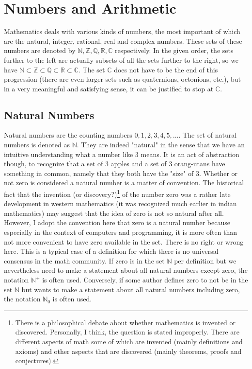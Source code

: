 \section{Numbers and Arithmetic} 

Mathematics deals with various kinds of numbers, the most important of which are the natural, integer, rational, real and complex numbers. These sets of these numbers are denoted by  $\mathbb{N,Z,Q,R,C}$ respectively. In the given order, the sets further to the left are actually subsets of all the sets further to the right, so we have $\mathbb{N \subset Z \subset Q \subset R \subset C}$. The set $\mathbb{C}$ does not have to be the end of this progression (there are even larger sets such as quaternions, octonions, etc.), but in a very meaningful and satisfying sense, it can be justified to stop at $\mathbb{C}$.

\subsection{Natural Numbers}
Natural numbers are the counting numbers $0,1,2,3,4,5,\ldots$. The set of natural numbers is denoted as $\mathbb{N}$. They are indeed "natural" in the sense that we have an intuitive understanding what a number like $3$ means. It is an act of abstraction though, to recognize that a set of 3 apples and a set of 3 orang-utans have something in common, namely that they both have the "size" of 3. Whether or not zero is considered a natural number is a matter of convention. The historical fact that the invention (or discovery?)\footnote{There is a philosophical debate about whether mathematics is invented or discovered. Personally, I think, the question is stated improperly. There are different aspects of math some of which are invented (mainly definitions and axioms) and other aspects that are discovered (mainly theorems, proofs and conjectures).} of the number zero was a rather late development in western mathematics (it was recognized much earlier in indian mathematics) may suggest that the idea of zero is not so natural after all. However, I adopt the convention here that zero is a natural number because especially in the context of computers and programming, it is more often than not more convenient to have zero available in the set. There is no right or wrong here. This is a typical case of a definition for which there is no universal consensus in the math community. If zero is in the set $\mathbb{N}$ per definition but we nevertheless need to make a statement about all natural numbers except zero, the notation $\mathbb{N}^+$ is often used. Conversely, if some author defines zero to not be in the set $\mathbb{N}$ but wants to make a statement about all natural numbers including zero, the notation $\mathbb{N}_0$ is often used.

